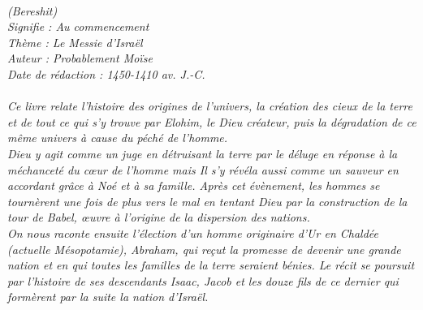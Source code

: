 \BFont
\noindent\hrulefill
{\footnotesize
\textit{
\bigskip
{\centering{}
\\(Bereshit)
\\Signifie : Au commencement
\\Thème : Le Messie d'Israël
\\Auteur : Probablement Moïse
\\Date de rédaction : 1450-1410 av. J.-C.\\}
}
\textit{
\\Ce livre relate l’histoire des origines de l’univers, la création des cieux de la terre et de tout ce qui s’y trouve par Elohim, le Dieu créateur, puis la dégradation de ce même univers à cause du péché de l’homme.
\\Dieu y agit comme un juge en détruisant la terre par le déluge en réponse à la méchanceté du cœur de l’homme mais Il s’y révéla aussi comme un sauveur en accordant grâce à Noé et à sa famille. Après cet évènement, les hommes se tournèrent une fois de plus vers le mal en tentant Dieu par la construction de la tour de Babel, œuvre à l’origine de la dispersion des nations. 
\\On nous raconte ensuite l’élection d’un homme originaire d’Ur en Chaldée (actuelle Mésopotamie), Abraham, qui reçut la promesse de devenir une grande nation et en qui toutes les familles de la terre seraient bénies. Le récit se poursuit par l’histoire de ses descendants Isaac, Jacob et les douze fils de ce dernier qui formèrent par la suite la nation d’Israël.\bigskip
}
}
\par\nobreak\noindent\hrulefill
